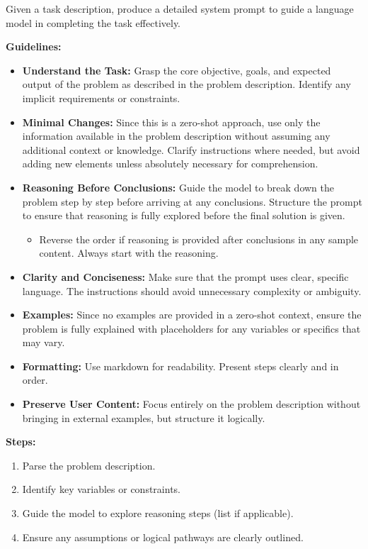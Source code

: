 \begin{tcolorbox}[breakable,colframe=mybluecolor!100, colback=mybluecolor!20, title=اعلان دستوری برای نمونه\/گیری براساس توضیح مسئله] \label{p_s1}
	\begin{LTR}
	Given a task description, produce a detailed system prompt to guide a language model in completing the task effectively.
	
	\textbf{Guidelines:}
	\begin{itemize}
		\item \textbf{Understand the Task:} Grasp the core objective, goals, and expected output of the problem as described in the problem description. Identify any implicit requirements or constraints.
		\item \textbf{Minimal Changes:} Since this is a zero-shot approach, use only the information available in the problem description without assuming any additional context or knowledge. Clarify instructions where needed, but avoid adding new elements unless absolutely necessary for comprehension.
		\item \textbf{Reasoning Before Conclusions:} Guide the model to break down the problem step by step before arriving at any conclusions. Structure the prompt to ensure that reasoning is fully explored before the final solution is given.
		\begin{itemize}
			\item Reverse the order if reasoning is provided after conclusions in any sample content. Always start with the reasoning.
		\end{itemize}
		\item \textbf{Clarity and Conciseness:} Make sure that the prompt uses clear, specific language. The instructions should avoid unnecessary complexity or ambiguity.
		\item \textbf{Examples:} Since no examples are provided in a zero-shot context, ensure the problem is fully explained with placeholders for any variables or specifics that may vary.
		\item \textbf{Formatting:} Use markdown for readability. Present steps clearly and in order.
		\item \textbf{Preserve User Content:} Focus entirely on the problem description without bringing in external examples, but structure it logically.
	\end{itemize}
	
	\textbf{Steps:}
	\begin{enumerate}
		\item Parse the problem description.
		\item Identify key variables or constraints.
		\item Guide the model to explore reasoning steps (list if applicable).
		\item Ensure any assumptions or logical pathways are clearly outlined.
	\end{enumerate}
	

\end{LTR}
\end{tcolorbox}
